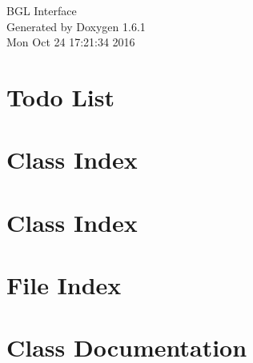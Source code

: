 \documentclass[a4paper]{book}
\begin{document}
\hypersetup{pageanchor=false}
\begin{titlepage}
\vspace*{7cm}
\begin{center}
{\Large BGL Interface }\\
\vspace*{1cm}
{\large Generated by Doxygen 1.6.1}\\
\vspace*{0.5cm}
{\small Mon Oct 24 17:21:34 2016}\\
\end{center}
\end{titlepage}
\clearemptydoublepage
{}
\tableofcontents
\clearemptydoublepage
{}
\hypersetup{pageanchor=true}
\chapter{Todo List}
\label{todo}
\hypertarget{todo}{}

\chapter{Class Index}

\chapter{Class Index}

\chapter{File Index}

\chapter{Class Documentation}


























\end{document}
